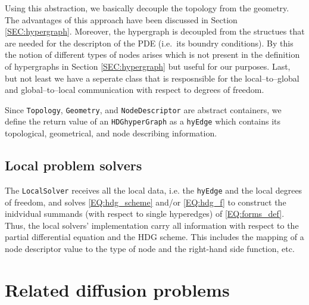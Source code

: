 \documentclass[a4paper, english, 12pt, reqno, draft]{amsart}
\theoremstyle{definition}
\theoremstyle{remark}
\numberwithin{equation}{section}
\newcommand{\code}[1]{\texttt{#1}}
\begin{document}
% 
Using this abstraction, we basically decouple the topology from the geometry. The advantages of this approach have been discussed in Section \ref{SEC:hypergraph}. Moreover, the hypergraph is decoupled from the structues that are needed for the descripton of the PDE (i.e.~its boundry conditions). By this the notion of different types of nodes arises which is not present in the definition of hypergraphs in Section \ref{SEC:hypergraph} but useful for our purposes. Last, but not least we have a seperate class that is resposnsible for the local--to--global and global--to--local communication with respect to degrees of freedom.

Since \code{Topology}, \code{Geometry}, and \code{NodeDescriptor} are abstract containers, we define the return value of an \code{HDGhyperGraph} as a \code{hyEdge} which contains its topological, geometrical, and node describing information.
% 
\subsection{Local problem solvers}
% 
The \code{LocalSolver} receives all the local data, i.e. the \code{hyEdge} and the local degrees of freedom, and solves \eqref{EQ:hdg_scheme} and/or \eqref{EQ:hdg_f} to construct the inidvidual summands (with respect to single hyperedges) of \eqref{EQ:forms_def}. Thus, the local solvers' implementation carry all information with respect to the partial differential equation and the HDG scheme. This includes the mapping of a node descriptor value to the type of node and the right-hand side function, etc.
% 
\section{Related diffusion problems}\label{SEC:related_diffusion_problems}
% 
\end{document}
